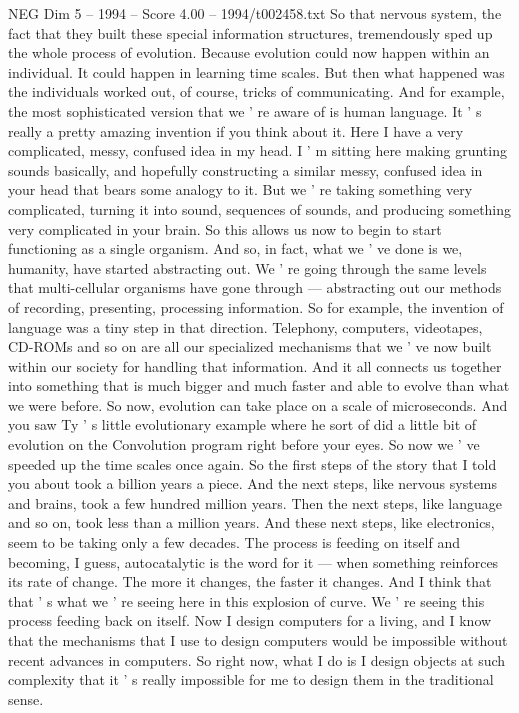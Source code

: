 \begin{textsample}{NEG Dim 5 – 1994 – Score 4.00 – 1994/t002458.txt}
So that nervous system, the fact that they built these special information structures, tremendously sped up the whole process of evolution.
Because evolution could now happen within an individual.
It could happen in learning time scales.
But then what happened was the individuals worked out, of course, tricks of communicating.
And for example, the most sophisticated version that we ' re aware of is human language.
It ' s really a pretty amazing invention if you think about it.
Here I have a very complicated, messy, confused idea in my head.
I ' m sitting here making grunting sounds basically, and hopefully constructing a similar messy, confused idea in your head that bears some analogy to it.
But we ' re taking something very complicated, turning it into sound, sequences of sounds, and producing something very complicated in your brain.
So this allows us now to begin to start functioning as a single organism.
And so, in fact, what we ' ve done is we, humanity, have started abstracting out.
We ' re going through the same levels that multi-cellular organisms have gone through — abstracting out our methods of recording, presenting, processing information.
So for example, the invention of language was a tiny step in that direction.
Telephony, computers, videotapes, CD-ROMs and so on are all our specialized mechanisms that we ' ve now built within our society for handling that information.
And it all connects us together into something that is much bigger and much faster and able to evolve than what we were before.
So now, evolution can take place on a scale of microseconds.
And you saw Ty ' s little evolutionary example where he sort of did a little bit of evolution on the Convolution program right before your eyes.
So now we ' ve speeded up the time scales once again.
So the first steps of the story that I told you about took a billion years a piece.
And the next steps, like nervous systems and brains, took a few hundred million years.
Then the next steps, like language and so on, took less than a million years.
And these next steps, like electronics, seem to be taking only a few decades.
The process is feeding on itself and becoming, I guess, autocatalytic is the word for it — when something reinforces its rate of change.
The more it changes, the faster it changes.
And I think that that ' s what we ' re seeing here in this explosion of curve.
We ' re seeing this process feeding back on itself.
Now I design computers for a living, and I know that the mechanisms that I use to design computers would be impossible without recent advances in computers.
So right now, what I do is I design objects at such complexity that it ' s really impossible for me to design them in the traditional sense.

\end{textsample}
